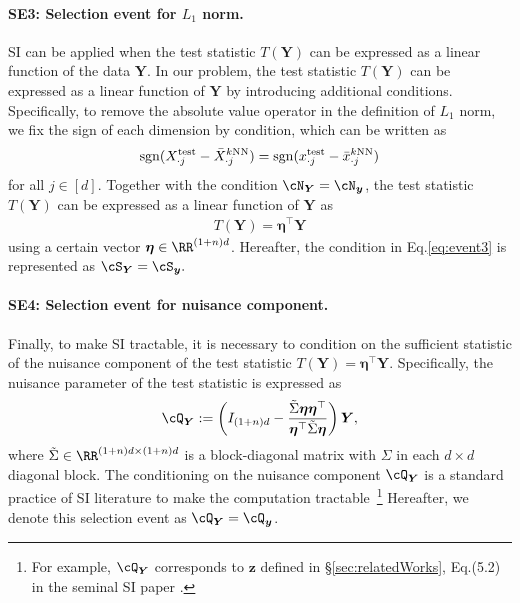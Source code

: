 \paragraph{SE3: Selection event for $L_1$ norm.}
%
SI can be applied when the test statistic $T(\bm Y)$ can be expressed as a linear function of the data $\bm Y$.
%
In our problem, the test statistic $T(\bm Y)$ can be expressed as a linear function of $\bm Y$ by introducing additional conditions.
%
Specifically, to remove the absolute value operator in the definition of $L_1$ norm, we fix the sign of each dimension by condition, which can be written as
\begin{align}
\label{eq:event3}
 {\rm sgn}
(
X^{\rm test}_{\cdot j}
-
\bar{X}^{\text{$k$NN}}_{\cdot j}
)
=
{\rm sgn}
(
 x^{\rm test}_{\cdot j} 
-
\bar{x}^{\text{$k$NN}}_{\cdot j}
)
\end{align}
for all $j \in [d]$. 
%
Together with the condition $\cN_{\bm Y} = \cN_{\bm y}$, the test statistic $T(\bm Y)$ can be expressed as a linear function of $\bm Y$ as  
\begin{align}
 T(\bm Y) = \bm \eta^\top \bm Y
\end{align}
using a certain vector $\bm \eta \in \RR^{(1+n)d}$.
%
Hereafter, the condition in Eq.\eqref{eq:event3} is represented as $\cS_{\bm Y} = \cS_{\bm y}.$

\paragraph{SE4: Selection event for nuisance component.}
%
Finally, to make SI tractable, it is necessary to condition on the sufficient statistic of the nuisance component of the test statistic $T(\bm Y) = \bm \eta^\top \bm Y$.
%
Specifically, the nuisance parameter of the test statistic is expressed as
\begin{align}
 \cQ_{\bm Y}
 :=
 \left(
 I_{(1+n)d}
 -
 \frac{
 \tilde{\Sigma} \bm \eta \bm \eta^\top
 }{
 \bm \eta^\top \tilde{\Sigma} \bm \eta
 }
 \right) \bm Y,
\end{align}
where
$\tilde{\Sigma} \in \RR^{(1+n)d \times (1+n)d}$
is a block-diagonal matrix with $\Sigma$ in each $d \times d$ diagonal block.
%
The conditioning on the nuisance component $\cQ_{\bm Y}$ is a standard practice of SI literature to make the computation tractable~\footnote{
For example, $\cQ_{\bm Y}$ corresponds to $\bm z$ defined in \S\ref{sec:relatedWorks}, Eq.(5.2) in the seminal SI paper \citet{lee2016exact}.
}
%
Hereafter, we denote this selection event as $\cQ_{\bm Y} = \cQ_{\bm y}$.

